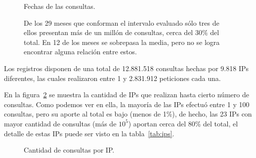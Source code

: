 \begin{figure}[ht]
  \caption{Fechas de las consultas.}\label{fig:dates}
  \vspace{-.2cm}
  \caption*{\small
    De los 29 meses que conforman el intervalo evaluado sólo tres de ellos
    presentan más de un millón de consultas, cerca del $30\%$ del total.
    En 12 de los meses se sobrepasa la media, pero no se logra encontrar
    alguna relación entre estos.
  }
\end{figure}

Los registros disponen de una total de 12.881.518 consultas hechas por 9.818 IPs
diferentes, las cuales realizaron entre 1 y 2.831.912 peticiones cada una.

En la figura~\ref{fig:ips} se muestra la cantidad de IPs que realizan hasta
cierto número de consultas.
Como podemos ver en ella, la mayoría de las IPs efectuó entre 1 y 100 consultas,
pero su aporte al total es bajo (menos de 1\%), de hecho, las 23 IPs con mayor
cantidad de consultas (más de $10^5$) aportan cerca del 80\% del total, el
detalle de estas IPs puede ser visto en la tabla~\ref{tab:ips}.

\begin{figure}[ht]
  \caption{Cantidad de consultas por IP.}\label{fig:ips}
\end{figure}

